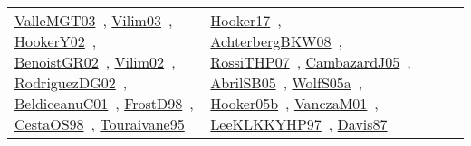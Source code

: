 {\begin{longtable}{lp{3cm}>{\raggedright\arraybackslash}p{6cm}>{\raggedright\arraybackslash}p{6cm}>{\raggedright\arraybackslash}p{8cm}}
\href{../works/ValleMGT03.pdf}{ValleMGT03}~\cite{ValleMGT03}, \href{../works/Vilim03.pdf}{Vilim03}~\cite{Vilim03}, \href{../works/HookerY02.pdf}{HookerY02}~\cite{HookerY02}, \href{../works/BenoistGR02.pdf}{BenoistGR02}~\cite{BenoistGR02}, \href{../works/Vilim02.pdf}{Vilim02}~\cite{Vilim02}, \href{../works/RodriguezDG02.pdf}{RodriguezDG02}~\cite{RodriguezDG02}, \href{../works/BeldiceanuC01.pdf}{BeldiceanuC01}~\cite{BeldiceanuC01}, \href{../works/FrostD98.pdf}{FrostD98}~\cite{FrostD98}, \href{../works/CestaOS98.pdf}{CestaOS98}~\cite{CestaOS98}, \href{../works/Touraivane95.pdf}{Touraivane95}~\cite{Touraivane95} & \href{../works/Hooker17.pdf}{Hooker17}~\cite{Hooker17}, \href{../works/AchterbergBKW08.pdf}{AchterbergBKW08}~\cite{AchterbergBKW08}, \href{../works/RossiTHP07.pdf}{RossiTHP07}~\cite{RossiTHP07}, \href{../works/CambazardJ05.pdf}{CambazardJ05}~\cite{CambazardJ05}, \href{../works/AbrilSB05.pdf}{AbrilSB05}~\cite{AbrilSB05}, \href{../works/WolfS05a.pdf}{WolfS05a}~\cite{WolfS05a}, \href{../works/Hooker05b.pdf}{Hooker05b}~\cite{Hooker05b}, \href{../works/VanczaM01.pdf}{VanczaM01}~\cite{VanczaM01}, \href{../works/LeeKLKKYHP97.pdf}{LeeKLKKYHP97}~\cite{LeeKLKKYHP97}, \href{../works/Davis87.pdf}{Davis87}~\cite{Davis87}\\

\end{longtable}}
